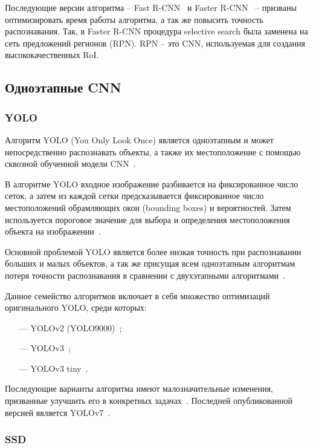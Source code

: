 Последующие версии алгоритма -- Fast R-CNN~\cite{fast-r-cnn} и Faster R-CNN~\cite{faster-r-cnn} -- призваны оптимизировать время работы алгоритма, а так же повысить точность распознавания. Так, в Faster R-CNN процедура selective search была заменена на сеть предложений регионов (RPN). RPN -- это CNN, используемая для создания высококачественных RoI.

\subsection{Одноэтапные CNN}

\subsubsection*{YOLO}

Алгоритм YOLO (You Only Look Once) является одноэтапным и может непосредственно распознавать объекты, а также их местоположение с помощью сквозной обученной модели CNN~\cite{yolo-review}.

В алгоритме YOLO входное изображение разбивается на фиксированное число сеток, а затем из каждой сетки предсказывается фиксированное число местоположений обрамляющих окон (bounding boxes) и вероятностей. Затем используется пороговое значение для выбора и определения местоположения объекта на изображении~\cite{yolo-review}.

Основной проблемой YOLO является более низкая точность при распознавании больших и малых объектов, а так же присущая всем одноэтапным алгоритмам потеря точности распознавания в сравнении с двухэтапными алгоритмами~\cite{yolo-review}.

Данное семейство алгоритмов включает в себя множество оптимизаций оригинального YOLO, среди которых:

\begin{itemize}
    \item[---] YOLOv2 (YOLO9000)~\cite{yolo9000};
    \item[---] YOLOv3~\cite{yolov3};
    \item[---] YOLOv3 tiny~\cite{yolov3-tiny}.
\end{itemize}

Последующие варианты алгоритма имеют малозначительные изменения, призванные улучшить его в конкретных задачах~\cite{yolov3-ships}. Последней опубликованной версией является YOLOv7~\cite{yolov7}.

\subsubsection*{SSD}

